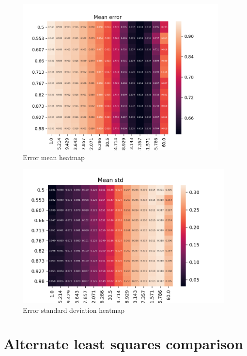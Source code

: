 \documentclass[ecp,tc,english]{iiufrgs}
\begin{document}
        \begin{figure}[htp]
            \centering
            \includegraphics[width=0.95\textwidth]{images/error_mean.png}
            \caption{Error mean heatmap}
            \label{fig:error_mean_heatmap}
        \end{figure}
        
        \begin{figure}[htp]
            \centering
            \includegraphics[width=0.98\textwidth]{images/error_std.png}
            \caption{Error standard deviation heatmap}
            \label{fig:error_std_heatmap}
        \end{figure}
    
    \newpage     
    \section{Alternate least squares comparison}
        
\end{document}
